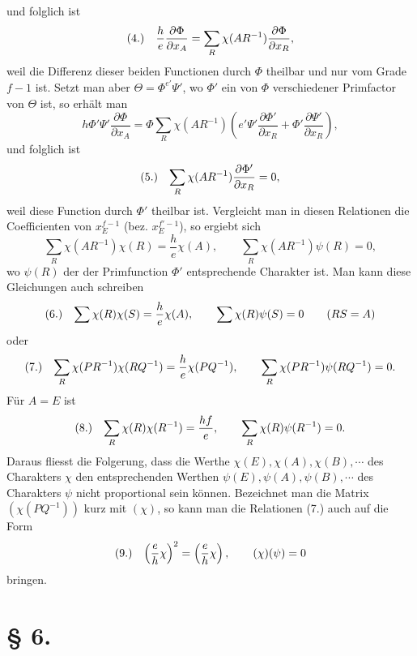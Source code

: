 \documentclass[11pt]{article}
\makeatletter
\newcommand{\frobtag}[2]{\[\begin{array}{@{}r@{\quad}l@{}}\textup{(#1)} & \displaystyle #2\end{array}\]}
\newcommand{\frobtagc}[2]{\[\begin{array}{@{}r@{\quad}c@{}}\textup{(#1)} & \displaystyle #2\end{array}\]}
\makeatother
\begin{document}
und folglich ist
\frobtagc{4.}{\frac{h}{e}\frac{\partial\Phi}{\partial x_A}=\sum_R\chi(AR^{-1})\frac{\partial\Phi}{\partial x_R},}
weil die Differenz dieser beiden Functionen durch $\Phi$ theilbar und nur vom Grade $f-1$ ist. Setzt man aber $\Theta=\Phi^{e'}\Psi'$, wo $\Phi'$ ein von $\Phi$ verschiedener Primfactor von $\Theta$ ist, so erhält man
\[
h\Phi'\Psi'\frac{\partial\Phi}{\partial x_A}=\Phi\sum_R\chi(AR^{-1})\left(e'\Psi'\frac{\partial\Phi'}{\partial x_R}+\Phi'\frac{\partial\Psi'}{\partial x_R}\right),
\]
und folglich ist
\frobtagc{5.}{\sum_R\chi(AR^{-1})\frac{\partial\Phi'}{\partial x_R}=0,}
weil diese Function durch $\Phi'$ theilbar ist. Vergleicht man in diesen Relationen die Coefficienten von $x_E^{f-1}$ (bez. $x_E^{f'-1}$), so ergiebt sich
\[
\sum_R\chi(AR^{-1})\chi(R)=\frac{h}{e}\chi(A),\qquad \sum_R\chi(AR^{-1})\psi(R)=0,
\]
wo $\psi(R)$ der der Primfunction $\Phi'$ entsprechende Charakter ist. Man kann diese Gleichungen auch schreiben
\frobtag{6.}{\sum\chi(R)\chi(S)=\frac{h}{e}\chi(A),\qquad \sum\chi(R)\psi(S)=0\qquad(RS=A)}
oder
\frobtag{7.}{\sum_R\chi(PR^{-1})\chi(RQ^{-1})=\frac{h}{e}\chi(PQ^{-1}),\qquad \sum_R\chi(PR^{-1})\psi(RQ^{-1})=0.}
Für $A=E$ ist
\frobtag{8.}{\sum_R\chi(R)\chi(R^{-1})=\frac{hf}{e},\qquad \sum_R\chi(R)\psi(R^{-1})=0.}
Daraus fliesst die Folgerung, dass die Werthe $\chi(E),\chi(A),\chi(B),\cdots$ des Charakters $\chi$ den entsprechenden Werthen $\psi(E),\psi(A),\psi(B),\cdots$ des Charakters $\psi$ nicht proportional sein können. Bezeichnet man die Matrix $(\chi(PQ^{-1}))$ kurz mit $(\chi)$, so kann man die Relationen (7.) auch auf die Form
\frobtagc{9.}{\left(\frac{e}{h}\chi\right)^2=\left(\frac{e}{h}\chi\right),\qquad (\chi)(\psi)=0}
bringen.

\section*{§ 6.}
\end{document}
